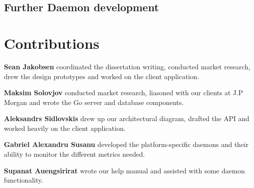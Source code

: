 \documentclass{l3proj}
\begin{document}
\subsection{Further Daemon development}


\section{Contributions}

\textbf{Sean Jakobsen} coordinated the dissertation writing, conducted market research, drew the design prototypes and worked on the client application. 

\textbf{Maksim Solovjov} conducted market research, liasoned with our clients at J.P Morgan and wrote the Go server and database components.

\textbf{Aleksandrs Sidlovskis} drew up our architectural diagram, drafted the API and worked heavily on the client application.

\textbf{Gabriel Alexandru Susanu} developed the platform-specific daemons and their ability to monitor the different metrics needed.

\textbf{Supanat Auengsirirat} wrote our help manual and assisted with some daemon functionality.


\end{document}
